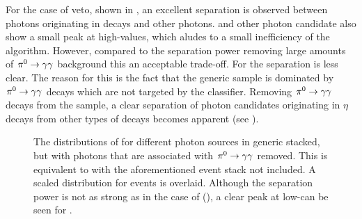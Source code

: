 For the case of \piz veto, shown in , an excellent separation is observed between photons originating in \piz decays and other photons.
\BtoXsgamma and other photon candidate also show a small peak at high-\piVeto values, which aludes to a small inefficiency of the algorithm.
However, compared to the separation power removing large amounts of $\pi^0\rightarrow\gamma\gamma$ background this an acceptable trade-off.
For \etaVeto the separation is less clear.
The reason for this is the fact that the generic \MC sample is dominated by $\pi^0\rightarrow\gamma\gamma$ decays which are not targeted by the \etaVeto classifier.
Removing $\pi^0\rightarrow\gamma\gamma$ decays from the sample, a clear separation of photon candidates originating in $\eta$ decays from other types of decays becomes apparent (see ).

\begin{figure}[htbp!]
    \centering
    \caption{\label{fig:vetos_nopi} The distributions of \etaVeto {} 
    for different photon sources in generic \MC stacked, but with photons that are associated with $\pi^0\rightarrow\gamma\gamma$ removed.
    This is equivalent to  with the aforementioned event stack not included.
    A scaled \etaVeto distribution for \BtoXsgamma events is overlaid.
    Although the separation power is not as strong as in the case of \piVeto (), a clear peak at low-\etaVeto can be seen for \BtoXsgamma.
    }
\end{figure}

